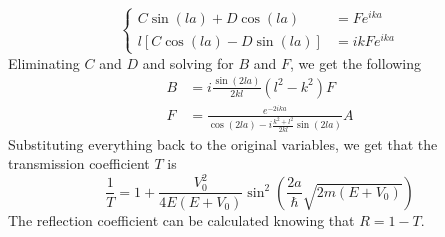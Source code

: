 \documentclass[a4paper, 11pt]{book}
\newcommand{\1}{\opr{\mathds{1}}}
\theoremstyle{plain}
\begin{document}
	\begin{equation}
		\left\{ \begin{aligned}
				C\sin(la)+D\cos(la)&=Fe^{ika}\\
				l\left[ C\cos(la)-D\sin(la) \right]&=ikFe^{ika}
		\end{aligned}\right.
		\label{eq:conditionsfinitewelll}
	\end{equation}
	Eliminating $C$ and $D$ and solving for $B$ and $F$, we get the following
	\begin{equation}
		\begin{aligned}
			B&=i\frac{\sin(2la)}{2kl}\left( l^2-k^2 \right)F\\
			F&=\frac{e^{-2ika}}{\cos(2la)-i\frac{k^2+l^2}{2kl}\sin(2la)}A
		\end{aligned}
		\label{eq:bfinitewell}
	\end{equation}
	Substituting everything back to the original variables, we get that the transmission coefficient $T$ is
	\begin{equation}
		\frac{1}{T}=1+\frac{V_0^2}{4E(E+V_0)}\sin^2\left( \frac{2a}{\hbar}\sqrt{2m\left( E+V_0 \right)} \right)
		\label{eq:transmissioncoeff}
	\end{equation}
	The reflection coefficient can be calculated knowing that $R=1-T$.
\end{document}

